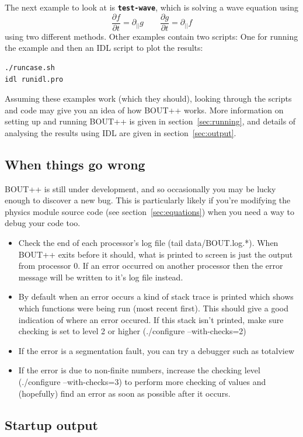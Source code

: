 \documentclass[12pt]{article}
\newcommand{\file}[1]{\texttt{\bf #1}}
\newcommand{\deriv}[2]{\ensuremath{\frac{\partial #1}{\partial #2}}}
\begin{document}
The next example to look at is \file{test-wave}, which is solving a wave equation using
\[
\deriv{f}{t} = \partial_{||} g \qquad \deriv{g}{t} = \partial_{||} f 
\]
using two different methods. Other examples contain two scripts: One for running the example and then an IDL script
to plot the results:
\begin{verbatim}
./runcase.sh
idl runidl.pro
\end{verbatim}

Assuming these examples work (which they should), looking through the scripts and code
may give you an idea of how BOUT++ works. More information on setting up and running BOUT++ is given
in section~\ref{sec:running}, and details of analysing the results using IDL are given in
section~\ref{sec:output}.

\subsection{When things go wrong}

BOUT++ is still under development, and so occasionally you may be lucky
enough to discover a new bug. This is particularly likely if you're modifying
the physics module source code (see section~\ref{sec:equations}) when you
need a way to debug your code too.

\begin{itemize}
\item Check the end of each processor's log file (tail data/BOUT.log.*). When BOUT++ exits before
it should, what is printed to screen is just the output from processor 0.
If an error occurred on another processor then the error message will be written to it's log file instead.
\item By default when an error occurs a kind of stack trace is printed which shows which functions
were being run (most recent first). This should give a good indication of where an error occured.
If this stack isn't printed, make sure checking is set to level 2 or higher (./configure --with-checks=2)
\item If the error is a segmentation fault, you can try a debugger such as totalview
\item If the error is due to non-finite numbers, increase the checking level
(./configure --with-checks=3) to perform more checking of values
and (hopefully) find an error as soon as possible after it occurs.
\end{itemize}

\subsection{Startup output}
\end{document}
